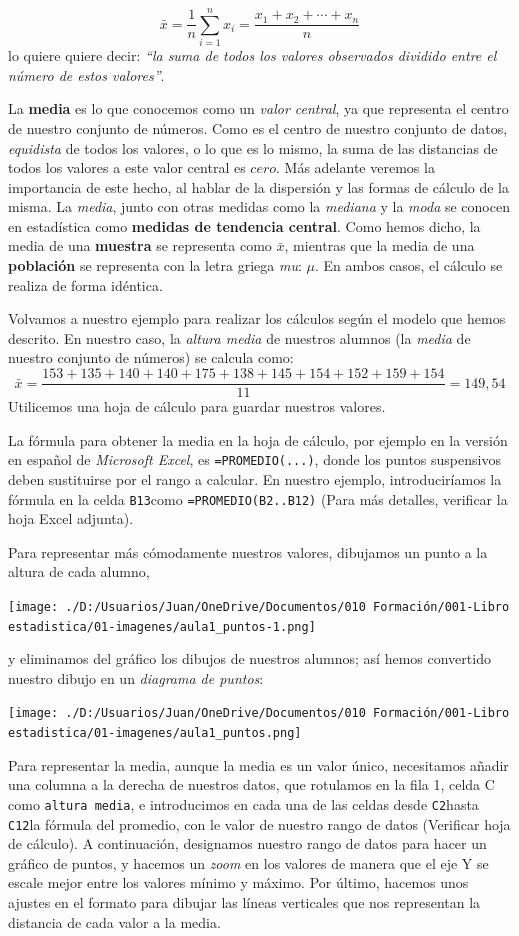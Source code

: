 \documentclass[
  letterpaper,
]{scrbook}
\begin{document}
\[
{\bar{x}={\frac {1}{n}}\sum _{i=1}^{n}x_{i}={\frac {x_{1}+x_{2}+\cdots +x_{n}}{n}}}
\] lo quiere quiere decir: \emph{``la suma de todos los valores
observados dividido entre el número de estos valores''}.

La \textbf{media} es lo que conocemos como un \emph{valor central}, ya
que representa el centro de nuestro conjunto de números. Como es el
centro de nuestro conjunto de datos, \emph{equidista} de todos los
valores, o lo que es lo mismo, la suma de las distancias de todos los
valores a este valor central es \(cero\). Más adelante veremos la
importancia de este hecho, al hablar de la dispersión y las formas de
cálculo de la misma. La \emph{media}, junto con otras medidas como la
\emph{mediana} y la \emph{moda} se conocen en estadística como
\textbf{medidas de tendencia central}. Como hemos dicho, la media de una
\textbf{muestra} se representa como \(\bar{x}\), mientras que la media
de una \textbf{población} se representa con la letra griega \emph{mu}:
\(\mu\). En ambos casos, el cálculo se realiza de forma idéntica.

Volvamos a nuestro ejemplo para realizar los cálculos según el modelo
que hemos descrito. En nuestro caso, la \emph{altura media} de nuestros
alumnos (la \emph{media} de nuestro conjunto de números) se calcula
como: \[
\bar{x} = \frac{153+135+140+140+175+138+145+154+152+159+154}{11} = 149,54
\] Utilicemos una hoja de cálculo para guardar nuestros valores.

La fórmula para obtener la media en la hoja de cálculo, por ejemplo en
la versión en español de \emph{Microsoft Excel}, es
\texttt{=PROMEDIO(...)}, donde los puntos suspensivos deben sustituirse
por el rango a calcular. En nuestro ejemplo, introduciríamos la fórmula
en la celda \texttt{B13}como \texttt{=PROMEDIO(B2..B12)} (Para más
detalles, verificar la hoja Excel adjunta).

Para representar más cómodamente nuestros valores, dibujamos un punto a
la altura de cada alumno,

\texttt{[image: ./D:/Usuarios/Juan/OneDrive/Documentos/010 Formación/001-Libro estadistica/01-imagenes/aula1\_puntos-1.png]}

y eliminamos del gráfico los dibujos de nuestros alumnos; así hemos
convertido nuestro dibujo en un \emph{diagrama de puntos}:

\texttt{[image: ./D:/Usuarios/Juan/OneDrive/Documentos/010 Formación/001-Libro estadistica/01-imagenes/aula1\_puntos.png]}

Para representar la media, aunque la media es un valor único,
necesitamos añadir una columna a la derecha de nuestros datos, que
rotulamos en la fila 1, celda C como \texttt{altura\ media}, e
introducimos en cada una de las celdas desde \texttt{C2}hasta
\texttt{C12}la fórmula del promedio, con le valor de nuestro rango de
datos (Verificar hoja de cálculo). A continuación, designamos nuestro
rango de datos para hacer un gráfico de puntos, y hacemos un \emph{zoom}
en los valores de manera que el eje Y se escale mejor entre los valores
mínimo y máximo. Por último, hacemos unos ajustes en el formato para
dibujar las líneas verticales que nos representan la distancia de cada
valor a la media.
\end{document}
